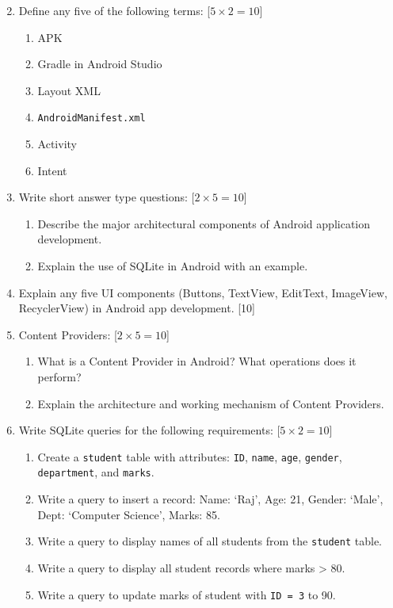 \documentclass[11pt,a4paper]{article}
\begin{document}
\begin{enumerate}[label=   \textbf{\arabic*.}]
    \setcounter{enumii}{1}
    \item Define any five of the following terms: \hfill [$5  \times 2 = 10$]
    
\begin{enumerate}[label=(\alph*)]
        \item APK
        \item Gradle in Android Studio
        \item Layout XML
        \item   \texttt{AndroidManifest.xml}
        \item Activity
        \item Intent
    \end{enumerate}

    \item Write short answer type questions: \hfill [$2  \times 5 = 10$]
    
\begin{enumerate}[label=(\alph*)]
        \item Describe the major architectural components of Android application development.
        \item Explain the use of SQLite in Android with an example.
    \end{enumerate}

    \item Explain any five UI components (Buttons, TextView, EditText, ImageView, RecyclerView) in Android app development. \hfill [10]

    \item Content Providers: \hfill [$2  \times 5 = 10$]
    
\begin{enumerate}[label=(\alph*)]
        \item What is a Content Provider in Android? What operations does it perform?
        \item Explain the architecture and working mechanism of Content Providers.
    \end{enumerate}

    \item Write SQLite queries for the following requirements: \hfill [$5  \times 2 = 10$]
    
\begin{enumerate}[label=(\alph*)]
        \item Create a   \texttt{student} table with attributes:   \texttt{ID},   \texttt{name},   \texttt{age},   \texttt{gender},   \texttt{department}, and   \texttt{marks}.
        \item Write a query to insert a record: Name: `Raj', Age: 21, Gender: `Male', Dept: `Computer Science', Marks: 85.
        \item Write a query to display names of all students from the   \texttt{student} table.
        \item Write a query to display all student records where marks > 80.
        \item Write a query to update marks of student with   \texttt{ID = 3} to 90.
    \end{enumerate}


\end{enumerate}
\end{document}

